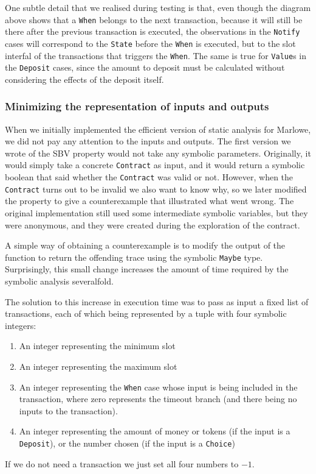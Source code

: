 \documentclass[english,runningheads]{llncs}
\begin{document}
One subtle detail that we realised during testing is that, even though
the diagram above shows that a \texttt{When} belongs to the next transaction,
because it will still be there after the previous transaction is executed,
the observations in the \texttt{Notify} cases will correspond to the
\texttt{State} before the \texttt{When} is executed, but to the slot
interfal of the transactions that triggers the \texttt{When}. The same
is true for \texttt{Value}s in the \texttt{Deposit} cases, since the amount
to deposit must be calculated without considering the effects of the
deposit itself. 

\subsubsection{Minimizing the representation of inputs and outputs }

When we initially implemented the efficient version of static analysis
for Marlowe, we did not pay any attention to the inputs and outputs.
The first version we wrote of the SBV property would not take any
symbolic parameters. Originally, it would simply take a concrete \texttt{Contract}
as input, and it would return a symbolic boolean that said whether
the \texttt{Contract} was valid or not. However, when the \texttt{Contract}
turns out to be invalid we also want to know why, so we later modified
the property to give a counterexample that illustrated what went wrong.
The original implementation still used some intermediate symbolic
variables, but they were anonymous, and they were created during the
exploration of the contract.

A simple way of obtaining a counterexample is to modify the output
of the function to return the offending trace using the symbolic \texttt{Maybe}
type. Surprisingly, this small change increases the amount of time
required by the symbolic analysis severalfold.

The solution to this increase in execution time was to pass as input
a fixed list of transactions, each of which being represented by a
tuple with four symbolic integers:
\begin{enumerate}
\item An integer representing the minimum slot
\item An integer representing the maximum slot
\item An integer representing the \texttt{When} case whose input is being
included in the transaction, where zero represents the timeout branch
(and there being no inputs to the transaction).
\item An integer representing the amount of money or tokens (if the input
is a \texttt{Deposit}), or the number chosen (if the input is a \texttt{Choice})
\end{enumerate}
If we do not need a transaction we just set all four numbers to $-1$.
\end{document}
